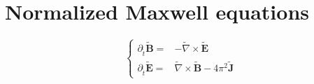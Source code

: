 \documentclass[11pt,a4paper]{report}
\begin{document}
\section*{Normalized Maxwell equations}
$$
\begin{cases}
    \partial_{\widetilde{t}} \widetilde{\mathbf{B}} = & - \widetilde{\nabla} \times \widetilde{\mathbf{E}} \\
    \partial_{\widetilde{t}} \widetilde{\mathbf{E}} = & \widetilde{\nabla} \times \widetilde{\mathbf{B}} - 4\pi^2 \widetilde{\mathbf{J}}
\end{cases}
$$
\end{document}
